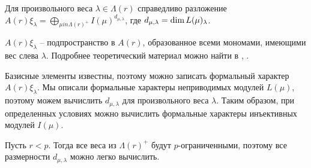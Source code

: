 \begin{proposition}
Для произвольного веса $ \lambda \in \Lambda(r) $ справедливо разложение \\
$ A(r)\xi_{\lambda} = \bigoplus_{\mu in \Lambda(r)^+} I(\mu)^{d_{\mu, \lambda}} $, 
где $ d_{\mu, \lambda} = \mbox{\textup{dim}}\, L(\mu)_{\lambda} $.
\end{proposition}

$ A(r)\xi_{\lambda} $ -- подпространство в $ A(r) $, образованное всеми мономами, имеющими вес слева $ \lambda $. 
Подробнее теоретический материал можно найти в \cite{la_scala}, \cite{borel_subalgebras}.

Базисные элементы известны, поэтому можно записать формальный характер $ A(r)\xi_{\lambda} $.
Мы описали формальные характеры неприводимых модулей $ L(\mu) $, поэтому можем вычислить $ d_{\mu, \lambda} $ для произвольного веса $ \lambda $.
Таким образом, при определенных условиях можно вычислить формальные характеры инъективных модулей $ I(\mu) $.

Пусть $ r < p $. Тогда все веса из $ \Lambda(r)^+ $ будут $p$-ограниченными, поэтому все размерности $ d_{\mu, \lambda} $ можно легко вычислить.
